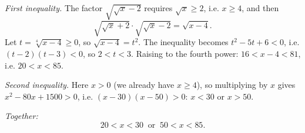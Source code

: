 \emph{First inequality.} The factor $\sqrt{\sqrt x-2}$ requires $\sqrt x\ge2$, i.e. $x\ge4$, and then
\[\sqrt{\sqrt x+2}\cdot\sqrt{\sqrt x-2}=\sqrt{x-4}.\]
Let $t=\sqrt[4]{x-4}\ge0$, so $\sqrt{x-4}=t^2$. The inequality becomes $t^2-5t+6<0$, i.e. $(t-2)(t-3)<0$, so $2<t<3$. Raising to the fourth power: $16<x-4<81$, i.e. $20<x<85$.

\emph{Second inequality.} Here $x>0$ (we already have $x\ge4$), so multiplying by $x$ gives $x^2-80x+1500>0$, i.e. $(x-30)(x-50)>0$: $x<30$ or $x>50$.

\emph{Together:}
\[\boxed{20<x<30\ \text{ or }\ 50<x<85}.\]

